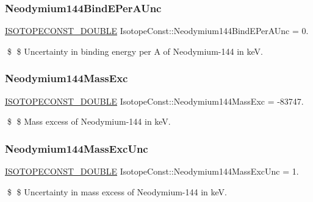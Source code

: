 \subsubsection{\texorpdfstring{Neodymium144\+Bind\+E\+Per\+A\+Unc}{Neodymium144BindEPerAUnc}}
{\footnotesize\ttfamily \mbox{\hyperlink{group___isotope_const-_macros_ga8f45a7272ce02c0b4c65c44636ed719a}{I\+S\+O\+T\+O\+P\+E\+C\+O\+N\+S\+T\+\_\+\+D\+O\+U\+B\+LE}} Isotope\+Const\+::\+Neodymium144\+Bind\+E\+Per\+A\+Unc = 0.}

\$ \$ Uncertainty in binding energy per A of Neodymium-\/144 in keV. \mbox{\label{group___isotope_const-_neodymium-_nd144_ga41817d72551f64ac74a2279709f37753}} 
\subsubsection{\texorpdfstring{Neodymium144\+Mass\+Exc}{Neodymium144MassExc}}
{\footnotesize\ttfamily \mbox{\hyperlink{group___isotope_const-_macros_ga8f45a7272ce02c0b4c65c44636ed719a}{I\+S\+O\+T\+O\+P\+E\+C\+O\+N\+S\+T\+\_\+\+D\+O\+U\+B\+LE}} Isotope\+Const\+::\+Neodymium144\+Mass\+Exc = -\/83747.}

\$ \$ Mass excess of Neodymium-\/144 in keV. \mbox{\label{group___isotope_const-_neodymium-_nd144_gadc04c15e944f309d88af835179eb8081}} 
\subsubsection{\texorpdfstring{Neodymium144\+Mass\+Exc\+Unc}{Neodymium144MassExcUnc}}
{\footnotesize\ttfamily \mbox{\hyperlink{group___isotope_const-_macros_ga8f45a7272ce02c0b4c65c44636ed719a}{I\+S\+O\+T\+O\+P\+E\+C\+O\+N\+S\+T\+\_\+\+D\+O\+U\+B\+LE}} Isotope\+Const\+::\+Neodymium144\+Mass\+Exc\+Unc = 1.}

\$ \$ Uncertainty in mass excess of Neodymium-\/144 in keV. \mbox{\label{group___isotope_const-_neodymium-_nd144_gadb7a2436e40bc8392635a1977e5b8914}} 
